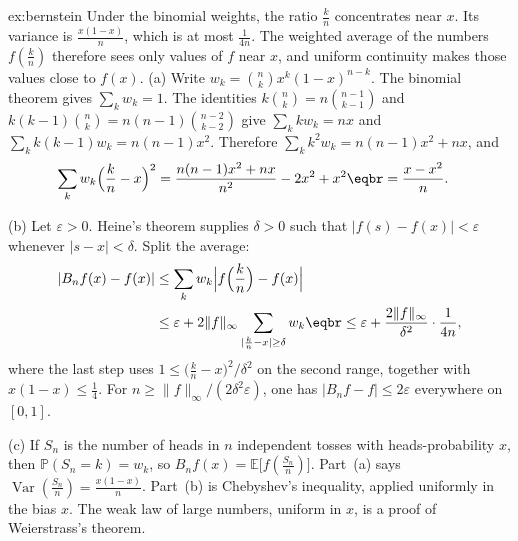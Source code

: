 \begin{solution}{ex:bernstein}
\idea Under the binomial weights, the ratio $\frac kn$ concentrates near $x$. Its variance is $\frac{x(1-x)}n$, which is at most $\frac1{4n}$. The weighted average of the numbers $f(\frac kn)$ therefore sees only values of $f$ near $x$, and uniform continuity makes those values close to $f(x)$.
\writeup (a) Write $w_k=\binom nkx^k(1-x)^{n-k}$. The binomial theorem gives $\sum_k w_k=1$. The identities $k\binom nk=n\binom{n-1}{k-1}$ and $k(k-1)\binom nk=n(n-1)\binom{n-2}{k-2}$ give $\sum_k kw_k=nx$ and $\sum_k k(k-1)w_k=n(n-1)x^2$. Therefore $\sum_k k^2 w_k=n(n-1)x^2+nx$, and
\[\begin{aligned}\sum_kw_k\Bigl(\frac kn-x\Bigr)^2&=\frac{n(n-1)x^2+nx}{n^2}-2x^2+x^2\eqbr=\frac{x-x^2}n.\end{aligned}\]

(b) Let $\varepsilon>0$. Heine's theorem supplies $\delta>0$ such that $|f(s)-f(x)|<\varepsilon$ whenever $|s-x|<\delta$. Split the average:
\[\begin{aligned}|B_nf(x)-f(x)|&\le\sum_kw_k\Bigl|f\Bigl(\frac kn\Bigr)-f(x)\Bigr|\\&\le\varepsilon+2\|f\|_\infty\sum_{|\frac kn-x|\ge\delta}w_k\eqbr\le\varepsilon+\frac{2\|f\|_\infty}{\delta^2}\cdot\frac1{4n},\end{aligned}\]
where the last step uses $1\le\bigl(\frac kn-x\bigr)^2/\delta^2$ on the second range, together with $x(1-x)\le\frac14$. For $n\ge\|f\|_\infty/(2\delta^2\varepsilon)$, one has $|B_nf-f|\le 2\varepsilon$ everywhere on $[0,1]$.

(c) If $S_n$ is the number of heads in $n$ independent tosses with heads-probability $x$, then $\mathbb P(S_n=k)=w_k$, so $B_nf(x)=\mathbb E\bigl[f(\frac{S_n}n)\bigr]$. Part~(a) says $\operatorname{Var}(\frac{S_n}n)=\frac{x(1-x)}n$. Part~(b) is Chebyshev's inequality, applied uniformly in the bias $x$. The weak law of large numbers, uniform in $x$, is a proof of Weierstrass's theorem.
\end{solution}

